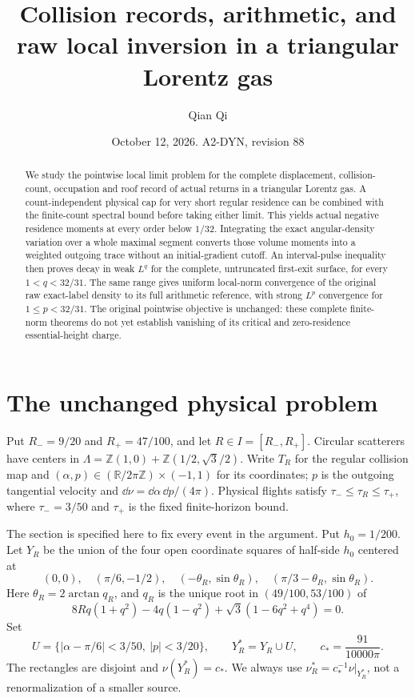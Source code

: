 \documentclass[11pt,reqno]{amsart}
\title[Collision records and raw local inversion]{Collision records, arithmetic, and raw local inversion in a triangular Lorentz gas}
\author{Qian Qi}
\date{October 12, 2026. A2-DYN, revision 88}
\numberwithin{equation}{section}
\theoremstyle{definition}
\theoremstyle{remark}\newtheorem{remark}[theorem]{Remark}
\newcommand{\R}{\mathbb R}\newcommand{\Z}{\mathbb Z}
\begin{document}
\raggedbottom
\begin{abstract}
We study the pointwise local limit problem for the complete displacement,
collision-count, occupation and roof record of actual returns in a
triangular Lorentz gas. A count-independent physical cap for very short
regular residence can be combined with the finite-count spectral bound
before taking either limit. This yields actual negative residence moments
at every order below $1/32$. Integrating the exact angular-density
variation over a whole maximal segment converts those volume moments
into a weighted outgoing trace without an initial-gradient cutoff.
An interval-pulse inequality then proves decay in weak $L^q$ for the
complete, untruncated first-exit surface, for every $1<q<32/31$.
The same range gives uniform local-norm convergence of the original
raw exact-label density to its full arithmetic reference, with strong
$L^p$ convergence for $1\le p<32/31$. The original pointwise objective
is unchanged: these complete finite-norm theorems do not yet establish
vanishing of its critical and zero-residence essential-height charge.
\end{abstract}
\maketitle

\section{The unchanged physical problem}
Put $R_-=9/20$ and $R_+=47/100$, and let $R\in I=[R_-,R_+]$. Circular scatterers have centers in
$\Lambda=\Z(1,0)+\Z(1/2,\sqrt3/2)$. Write $T_R$ for the regular
collision map and $(\alpha,p)\in(\R/2\pi\Z)\times(-1,1)$ for its
coordinates; $p$ is the outgoing tangential velocity and
$\dd\nu=\dd\alpha\,\dd p/(4\pi)$. Physical flights satisfy
$\tau_-\le\tau_R\le\tau_+$, where $\tau_-=3/50$ and $\tau_+$
is the fixed finite-horizon bound.

The section is specified here to fix every event in the argument.
Put $h_0=1/200$. Let $Y_R$ be the union of the four open coordinate
squares of half-side $h_0$ centered at
\[
 (0,0),\quad(\pi/6,-1/2),\quad
 (-\theta_R,\sin\theta_R),\quad
 (\pi/3-\theta_R,\sin\theta_R).
\]
Here $\theta_R=2\arctan q_R$, and $q_R$ is the unique root in
$(49/100,53/100)$ of
\[
 8Rq(1+q^2)-4q(1-q^2)+\sqrt3(1-6q^2+q^4)=0.
\]
Set
\[
 U=\{|\alpha-\pi/6|<3/50,\ |p|<3/20\},\qquad
 Y_R^*=Y_R\cup U,\qquad c_*=\frac{91}{10000\pi}.
\]
The rectangles are disjoint and $\nu(Y_R^*)=c_*$. We always use
$\nu_R^*=c_*^{-1}\nu|_{Y_R^*}$, not a renormalization of a smaller
source.
\end{document}
